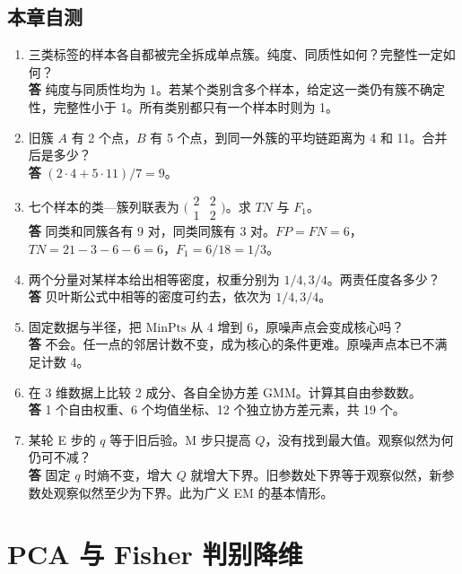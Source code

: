 \documentclass[UTF8,a4paper,zihao=-4,fontset=fandol]{ctexrep}
\begin{document}
\section{本章自测}
\begin{enumerate}
\item 三类标签的样本各自都被完全拆成单点簇。纯度、同质性如何？完整性一定如何？\\
\textbf{答} 纯度与同质性均为 1。若某个类别含多个样本，给定这一类仍有簇不确定性，完整性小于 1。所有类别都只有一个样本时则为 1。
\item 旧簇 $A$ 有 2 个点，$B$ 有 5 个点，到同一外簇的平均链距离为 4 和 11。合并后是多少？\\
\textbf{答} $(2\cdot4+5\cdot11)/7=9$。
\item 七个样本的类—簇列联表为 $\bigl(\begin{smallmatrix}2&2\\1&2\end{smallmatrix}\bigr)$。求 $TN$ 与 $F_1$。\\
\textbf{答} 同类和同簇各有 9 对，同类同簇有 3 对。$FP=FN=6$，$TN=21-3-6-6=6$，$F_1=6/18=1/3$。
\item 两个分量对某样本给出相等密度，权重分别为 $1/4,3/4$。两责任度各多少？\\
\textbf{答} 贝叶斯公式中相等的密度可约去，依次为 $1/4,3/4$。
\item 固定数据与半径，把 $\mathrm{MinPts}$ 从 4 增到 6，原噪声点会变成核心吗？\\
\textbf{答} 不会。任一点的邻居计数不变，成为核心的条件更难。原噪声点本已不满足计数 4。
\item 在 3 维数据上比较 2 成分、各自全协方差 GMM。计算其自由参数数。\\
\textbf{答} 1 个自由权重、6 个均值坐标、12 个独立协方差元素，共 19 个。
\item 某轮 E 步的 $q$ 等于旧后验。M 步只提高 $Q$，没有找到最大值。观察似然为何仍可不减？\\
\textbf{答} 固定 $q$ 时熵不变，增大 $Q$ 就增大下界。旧参数处下界等于观察似然，新参数处观察似然至少为下界。此为广义 EM 的基本情形。
\end{enumerate}

\chapter{PCA 与 Fisher 判别降维}
\end{document}
